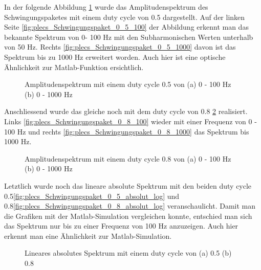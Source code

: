 In der folgende Abbildung \ref{fig:plecs_Schwingungspakete_Amplitudenspektrum_ 0_5_100_1000} wurde das Amplitudenspektrum des Schwingungspaketes mit einem duty cycle von 0.5 dargestellt. Auf der linken Seite \ref{fig:plecs_Schwingungspaket_0_5_100} der Abbildung erkennt man das bekannte Spektrum von 0- 100 Hz mit den Subharmonischen Werten unterhalb von 50 Hz. Rechts \ref{fig:plecs_Schwingungspaket_0_5_1000} davon ist das Spektrum bis zu 1000 Hz erweitert worden. Auch hier ist eine optische Ähnlichkeit zur  Matlab-Funktion ersichtlich.     
\begin{figure}[ht!]
	\centering
	\qquad
	\caption{Amplitudenspektrum mit einem duty cycle 0.5 von (a) 0 - 100 Hz (b) 0 - 1000 Hz}
	\label{fig:plecs_Schwingungspakete_Amplitudenspektrum_ 0_5_100_1000}
\end{figure}

Anschliessend wurde das gleiche noch mit dem duty cycle von 0.8 \ref{fig:plecs_Schwingungspakete_Amplitudenspektrum_ 0_8_100_1000} realisiert. Links \ref{fig:plecs_Schwingungspaket_0_8_100} wieder mit einer Frequenz von 0 - 100 Hz und rechts \ref{fig:plecs_Schwingungspaket_0_8_1000} das Spektrum bis 1000 Hz.
\begin{figure}[ht!]
	\centering
	\qquad
	\caption{Amplitudenspektrum mit einem duty cycle 0.8 von (a) 0 - 100 Hz (b) 0 - 1000 Hz}
	\label{fig:plecs_Schwingungspakete_Amplitudenspektrum_ 0_8_100_1000}
\end{figure}


Letztlich wurde noch das lineare absolute Spektrum mit den beiden duty cycle 0.5\ref{fig:plecs_Schwingungspaket_0_5_absolut_log} und 0.8\ref{fig:plecs_Schwingungspaket_0_8_absolut_log} veranschaulicht. Damit man die Grafiken mit der Matlab-Simulation vergleichen konnte, entschied man sich das Spektrum nur bis zu einer Frequenz von 100 Hz anzuzeigen. Auch hier erkennt man eine Ähnlichkeit zur Matlab-Simulation. 


\begin{figure}[ht!]
	\centering
	\qquad
	\caption{Lineares absolutes Spektrum mit einem duty cycle von (a) 0.5 (b) 0.8}
	\label{fig:plecs_Schwingungspakete_absolut log}
\end{figure}

